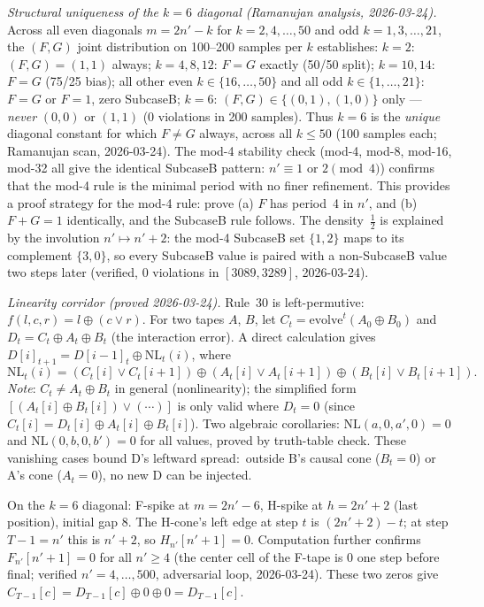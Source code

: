 \documentclass[11pt]{article}
\theoremstyle{plain}
\theoremstyle{definition}
\begin{document}
\emph{Structural uniqueness of the $k=6$ diagonal (Ramanujan analysis, 2026-03-24).}
Across all even diagonals $m = 2n'-k$ for $k=2,4,\ldots,50$ and odd $k=1,3,\ldots,21$,
the $(F,G)$ joint distribution on 100--200 samples per $k$ establishes:
$k=2$: $(F,G)=(1,1)$ always;
$k=4,8,12$: $F=G$ exactly (50/50 split);
$k=10,14$: $F=G$ (75/25 bias);
all other even $k\in\{16,\ldots,50\}$ and all odd $k\in\{1,\ldots,21\}$: $F=G$ or $F=1$, zero SubcaseB;
$k=6$: $(F,G)\in\{(0,1),(1,0)\}$ only --- \emph{never} $(0,0)$ or $(1,1)$ (0 violations in 200 samples).
Thus $k=6$ is the \emph{unique} diagonal constant for which $F\neq G$ always,
across all $k\leq 50$ (100 samples each; Ramanujan scan, 2026-03-24).
The mod-4 stability check (mod-4, mod-8, mod-16, mod-32 all give the identical
SubcaseB pattern: $n'\equiv 1$ or $2\pmod{4}$) confirms that the mod-4 rule
is the minimal period with no finer refinement.
This provides a proof strategy for the mod-4 rule:
prove (a) $F$ has period~4 in $n'$, and (b) $F+G=1$ identically, and the SubcaseB
rule follows.  The density~$\frac{1}{2}$ is explained by the involution $n' \mapsto n'+2$:
the mod-4 SubcaseB set $\{1,2\}$ maps to its complement $\{3,0\}$, so every SubcaseB
value is paired with a non-SubcaseB value two steps later (verified, 0 violations in
$[3089, 3289]$, 2026-03-24).

\emph{Linearity corridor (proved 2026-03-24).}
Rule~30 is left-permutive: $f(l,c,r) = l \oplus (c \vee r)$.
For two tapes $A$, $B$, let $C_t = \mathrm{evolve}^t(A_0\oplus B_0)$ and
$D_t = C_t \oplus A_t \oplus B_t$ (the interaction error).  A direct calculation
gives $D[i]_{t+1} = D[i{-}1]_t \oplus \mathrm{NL}_t(i)$, where
\[
  \mathrm{NL}_t(i) = (C_t[i]\vee C_t[i{+}1]) \oplus (A_t[i]\vee A_t[i{+}1]) \oplus (B_t[i]\vee B_t[i{+}1]).
\]
\emph{Note}: $C_t \neq A_t \oplus B_t$ in general (nonlinearity); the simplified form
$[(A_t[i]\oplus B_t[i])\vee(\cdots)]$ is only valid where $D_t=0$
(since $C_t[i]=D_t[i]\oplus A_t[i]\oplus B_t[i]$).
Two algebraic corollaries: $\mathrm{NL}(a,0,a',0)=0$ and $\mathrm{NL}(0,b,0,b')=0$
for all values, proved by truth-table check.  These vanishing cases bound D's
leftward spread:\ outside B's causal cone ($B_t=0$) or A's cone ($A_t=0$),
no new D can be injected.

On the $k=6$ diagonal: F-spike at $m=2n'{-}6$, H-spike at $h=2n'{+}2$ (last position),
initial gap $8$.  The H-cone's left edge at step $t$ is $(2n'{+}2){-}t$; at step $T{-}1=n'$
this is $n'{+}2$, so $H_{n'}[n'{+}1]=0$.
Computation further confirms $F_{n'}[n'{+}1]=0$ for all $n'\geq 4$ (the center cell
of the F-tape is $0$ one step before final; verified $n'=4,\ldots,500$, adversarial loop, 2026-03-24).
These two zeros give $C_{T-1}[c]=D_{T-1}[c]\oplus 0\oplus 0=D_{T-1}[c]$.
\end{document}
